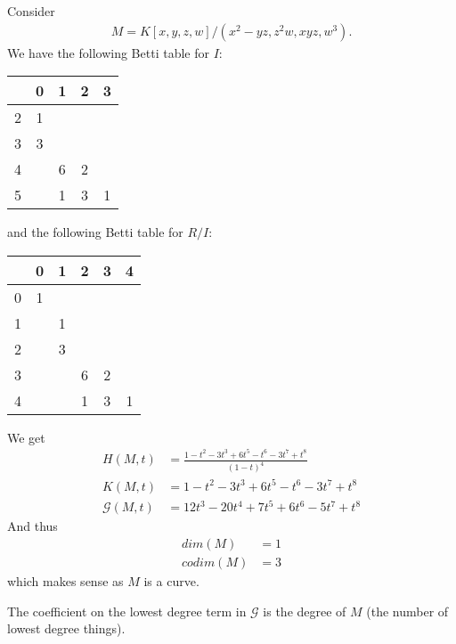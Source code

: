 \begin{example} Consider
    \begin{align*}
        M = K [x,y,z,w]/ ( x^2 - yz , z^2 w , xyz, w^3).
    \end{align*}
    We have the following Betti table for $I$:

    \begin{center}
    \begin{tabular}{ c | c c c c }
      & 0 & 1 & 2 & 3 \\
    \hline
    2 & 1 &   &   &   \\
    3 & 3 &   &   &   \\
    4 &   & 6 & 2 &   \\
    5 &   & 1 & 3 & 1 \\
    \end{tabular}
    \end{center}

    and the following Betti table for $R/I$:

    \begin{center}
    \begin{tabular}{ c | c c c c c }
      & 0 & 1 & 2 & 3 & 4 \\
    \hline
    0 & 1 &   &   &   &   \\
    1 &   & 1 &   &   &   \\
    2 &   & 3 &   &   &   \\
    3 &   &   & 6 & 2 &   \\
    4 &   &   & 1 & 3 & 1 \\
    \end{tabular}
    \end{center}

    We get
    \begin{align*}
        H(M,t) &= \frac{1 - t^2 - 3t^3 + 6t^5 - t^6 -3t^7 + t^8 }{(1-t)^4}\\
        K(M,t) &= 1 - t^2 - 3t^3 + 6t^5 - t^6 -3t^7 + t^8\\
        \mathscr{G}(M,t) &= 12t^3 -20t^4 + 7t^5 + 6t^6 -5t^7 + t^8
    \end{align*}
    And thus
    \begin{align*}
        dim(M) &= 1\\
        codim(M) &= 3
    \end{align*}
    which makes sense as $M $ is a curve.
\end{example}

\begin{definition}
    The coefficient on the lowest degree term in $\mathscr{G}$ is the degree of $M$ (the number of lowest degree things).
\end{definition}

